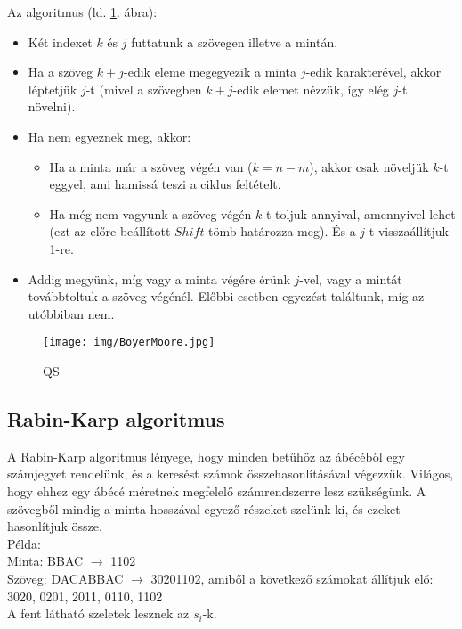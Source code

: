 \documentclass[margin=0px]{article}
\begin{document}
Az algoritmus (ld. \ref{fig:BoyerMoore}. ábra):
\begin{itemize}
    \item Két indexet $k$ és $j$ futtatunk a szövegen illetve a mintán.
    \item Ha a szöveg $k+j$-edik eleme megegyezik a minta $j$-edik karakterével, akkor léptetjük $j$-t (mivel a szövegben $k+j$-edik elemet nézzük, így elég $j$-t növelni).
    \item Ha nem egyeznek meg, akkor:
          \begin{itemize}
              \item Ha a minta már a szöveg végén van ($k=n-m$), akkor csak növeljük $k$-t eggyel, ami hamissá teszi a ciklus feltételt.
              \item Ha még nem vagyunk a szöveg végén $k$-t toljuk annyival, amennyivel lehet (ezt az előre beállított $Shift$ tömb határozza meg). És a $j$-t visszaállítjuk 1-re.
          \end{itemize}
    \item Addig megyünk, míg vagy a minta végére érünk $j$-vel, vagy a mintát továbbtoltuk a szöveg végénél. Előbbi esetben egyezést találtunk, míg az utóbbiban nem.
\end{itemize}

\begin{figure}[H]
    \centering
    \texttt{[image: img/BoyerMoore.jpg]}
    \caption{QS}
    \label{fig:BoyerMoore}
\end{figure}
\subsection{Rabin-Karp algoritmus}
A Rabin-Karp algoritmus lényege, hogy minden betűhöz az ábécéből egy számjegyet rendelünk, és a keresést számok összehasonlításával végezzük. Világos, hogy ehhez egy ábécé méretnek megfelelő számrendszerre lesz szükségünk. A szövegből mindig a minta hosszával egyező részeket szelünk ki, és ezeket hasonlítjuk össze.\\

\noindent
Példa:\\
Minta: BBAC $\rightarrow$ 1102 \\
Szöveg: DACABBAC $\rightarrow$ 30201102, amiből a következő számokat állítjuk elő: 3020, 0201, 2011, 0110, 1102\\

\noindent
A fent látható szeletek lesznek az $s_i$-k.\\
\end{document}

